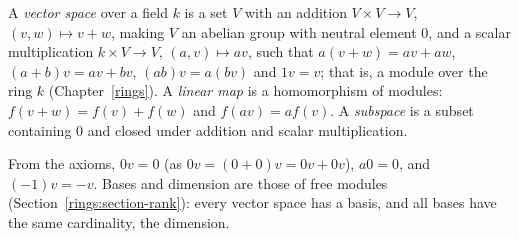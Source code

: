 \begin{definition}\label{linear-algebra:definition-vector-space}
A \emph{vector space} over a field $k$ is a set $V$ with an addition $V \times V \to V$, $(v, w) \mapsto v + w$, making $V$ an abelian group with neutral element $0$, and a scalar multiplication
$k \times V \to V$, $(a, v) \mapsto av$, such that $a(v + w) = av + aw$, $(a + b)v = av + bv$, $(ab)v = a(bv)$ and $1v = v$; that is, a module over the ring $k$ (Chapter~\ref{rings}). A
\emph{linear map} is a homomorphism of modules: $f(v + w) = f(v) + f(w)$ and $f(av) = af(v)$. A \emph{subspace} is a subset containing $0$ and closed under addition and scalar multiplication.
\end{definition}

From the axioms, $0v = 0$ (as $0v = (0 + 0)v = 0v + 0v$), $a0 = 0$, and $(-1)v = -v$. Bases and dimension are those of free modules (Section~\ref{rings:section-rank}): every vector space
has a basis, and all bases have the same cardinality, the dimension.

